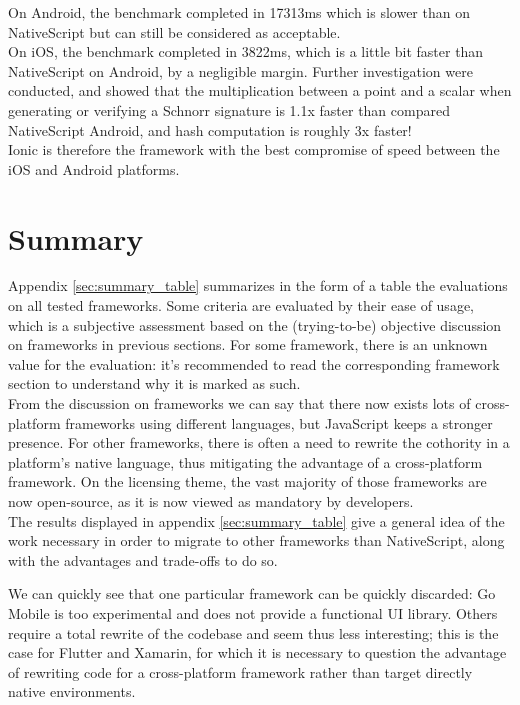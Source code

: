 \documentclass[11pt, a4paper, twoside, openright]{article} %
\begin{document}
{On Android, the benchmark completed in 17313ms which is slower than on NativeScript but can still be considered as acceptable.\\

On iOS, the benchmark completed in 3822ms, which is a little bit faster than NativeScript on Android, by a negligible margin. Further investigation were conducted, and showed that the multiplication between a point and a scalar when generating or verifying a Schnorr signature is 1.1x faster than compared NativeScript Android, and hash computation is roughly 3x faster!\\
Ionic is therefore the framework with the best compromise of speed between the iOS and Android platforms.

\newpage
\section{Summary}
Appendix \ref{sec:summary_table} summarizes in the form of a table the evaluations on all tested frameworks. Some criteria are evaluated by their ease of usage, which is a subjective assessment based on the (trying-to-be) objective discussion on frameworks in previous sections. For some framework, there is an unknown value for the evaluation: it's recommended to read the corresponding framework section to understand why it is marked as such.\\

From the discussion on frameworks we can say that there now exists lots of cross-platform frameworks using different languages, but JavaScript keeps a stronger presence. For other frameworks, there is often a need to rewrite the cothority in a platform's native language, thus mitigating the advantage of a cross-platform framework. On the licensing theme, the vast majority of those frameworks are now open-source, as it is now viewed as mandatory by developers.\\

The results displayed in appendix \ref{sec:summary_table} give a general idea of the work necessary in order to migrate to other frameworks than NativeScript, along with the advantages and trade-offs to do so. 

We can quickly see that one particular framework can be quickly discarded: Go Mobile is too experimental and does not provide a functional UI library. Others require a total rewrite of the codebase and seem thus less interesting; this is the case for Flutter and Xamarin, for which it is necessary to question the advantage of rewriting code for a cross-platform framework rather than target directly native environments.

}
\end{document}
